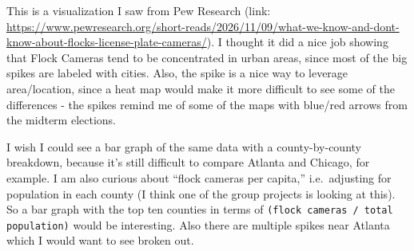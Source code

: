 \documentclass[11pt]{article}
\begin{document}
This is a visualization I saw from Pew Research (link: \url{https://www.pewresearch.org/short-reads/2026/11/09/what-we-know-and-dont-know-about-flocks-license-plate-cameras/}). I thought it did a nice job showing that Flock Cameras tend to be concentrated in urban areas, since most of the big spikes are labeled with cities. Also, the spike is a nice way to leverage area/location, since a heat map would make it more difficult to see some of the differences - the spikes remind me of some of the maps with blue/red arrows from the midterm elections.

\vspace{0.5em}
I wish I could see a bar graph of the same data with a county-by-county breakdown, because it's still difficult to compare Atlanta and Chicago, for example. I am also curious about ``flock cameras per capita,'' i.e.\ adjusting for population in each county (I think one of the group projects is looking at this). So a bar graph with the top ten counties in terms of \texttt{(flock cameras / total population)} would be interesting. Also there are multiple spikes near Atlanta which I would want to see broken out.
\end{document}
